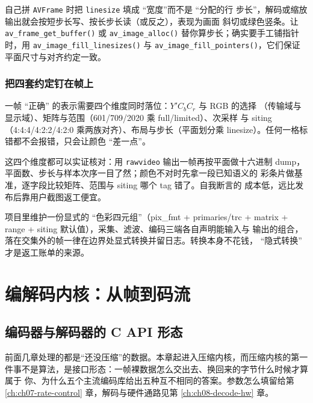 \documentclass[12pt,a4paper,fontset=fandol]{ctexbook}
\newcommand{\Fn}[1]{\texttt{#1()}}
\newcommand{\Tp}[1]{\texttt{#1}}
\begin{document}
\begin{note}[title={手写 linesize 是最常见的绿条来源}]
自己拼 \Tp{AVFrame} 时把 \Tp{linesize} 填成 ``宽度''而不是 ``分配的行
步长''，解码或缩放输出就会按短步长写、按长步长读（或反之），表现为画面
斜切或绿色竖条。让 \Fn{av\_frame\_get\_buffer} 或 \Fn{av\_image\_alloc}
替你算步长；确实要手工铺指针时，用 \Fn{av\_image\_fill\_linesizes} 与
\Fn{av\_image\_fill\_pointers}，它们保证平面尺寸与对齐约定一致。
\end{note}

\section{把四套约定钉在帧上}

一帧 ``正确'' 的表示需要四个维度同时落位：\(Y'C_bC_r\) 与 RGB 的选择
（传输域与显示域）、矩阵与范围（601/709/2020 乘 full/limited）、次采样
与 siting（4:4:4/4:2:2/4:2:0 乘两族对齐）、布局与步长（平面划分乘
linesize）。任何一格标错都不会报错，只会让颜色 ``差一点''。

这四个维度都可以实证核对：用 \Tp{rawvideo} 输出一帧再按平面做十六进制
dump，平面数、步长与样本次序一目了然；颜色不对时先拿一段已知语义的
彩条片做基准，逐字段比较矩阵、范围与 siting 哪个 tag 错了。自我断言的
成本低，远比发布后靠用户截图返工便宜。

\begin{guideline}[title={格式选择的最小充分集}]
项目里维护一份显式的 ``色彩四元组''（pix\_fmt + primaries/trc +
matrix + range + siting 默认值），采集、滤波、编码三端各自声明能输入与
输出的组合，落在交集外的帧一律在边界处显式转换并留日志。转换本身不花钱，
``隐式转换'' 才是返工账单的来源。
\end{guideline}

\part{编解码内核：从帧到码流}

\chapter{编码器与解码器的 C API 形态}
\label{ch:ch06-codec-api}

前面几章处理的都是``还没压缩''的数据。本章起进入压缩内核，而压缩内核的第一
件事不是算法，是接口形态：一帧裸数据怎么交出去、换回来的字节什么时候才算属于
你、为什么五个主流编码库给出五种互不相同的答案。参数怎么填留给第
\ref{ch:ch07-rate-control} 章，解码与硬件通路见第 \ref{ch:ch08-decode-hw} 章。
\end{document}
